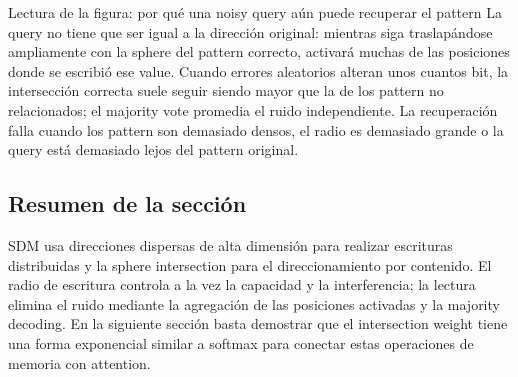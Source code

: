 \begin{knowledgebox}{Lectura de la figura: por qué una noisy query aún puede recuperar el pattern}
La query no tiene que ser igual a la dirección original: mientras siga traslapándose ampliamente con la sphere del pattern correcto, activará muchas de las posiciones donde se escribió ese value. Cuando errores aleatorios alteran unos cuantos bit, la intersección correcta suele seguir siendo mayor que la de los pattern no relacionados; el majority vote promedia el ruido independiente. La recuperación falla cuando los pattern son demasiado densos, el radio es demasiado grande o la query está demasiado lejos del pattern original.
\end{knowledgebox}

\subsection{Resumen de la sección}

SDM usa direcciones dispersas de alta dimensión para realizar escrituras distribuidas y la sphere intersection para el direccionamiento por contenido. El radio de escritura controla a la vez la capacidad y la interferencia; la lectura elimina el ruido mediante la agregación de las posiciones activadas y la majority decoding. En la siguiente sección basta demostrar que el intersection weight tiene una forma exponencial similar a softmax para conectar estas operaciones de memoria con attention.
